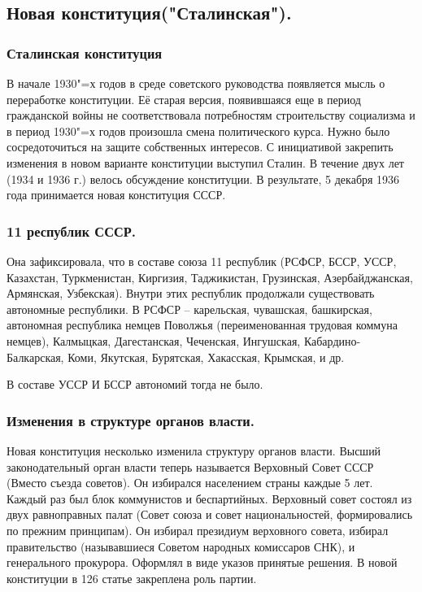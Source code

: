 \subsection{Новая конституция("Сталинская").}

\subsubsection{\textbf{Сталинская конституция}}
В начале 1930"=х годов в среде советского руководства появляется мысль о переработке конституции. Её старая версия, появившаяся еще в период гражданской войны не соответствовала потребностям строительству социализма и в период 1930"=х годов произошла смена политического курса. Нужно было сосредоточиться на защите собственных интересов. С инициативой закрепить изменения в новом варианте конституции выступил Сталин. В течение двух лет (1934 и 1936 г.) велось обсуждение конституции. В результате, 5 декабря 1936 года принимается новая конституция СССР. 

\subsubsection{\textbf{11 республик СССР.}}
Она зафиксировала, что в составе союза 11 республик (РСФСР, БССР, УССР, Казахстан, Туркменистан, Киргизия, Таджикистан, Грузинская, Азербайджанская, Армянская, Узбекская). Внутри этих республик продолжали существовать автономные республики. В РСФСР – карельская, чувашская, башкирская, автономная республика немцев Поволжья (переименованная трудовая коммуна немцев), Калмыцкая, Дагестанская, Чеченская, Ингушская, Кабардино-Балкарская, Коми, Якутская, Бурятская, Хакасская, Крымская, и др.

В составе УССР И БССР автономий тогда не было.

\subsubsection{\textbf{Изменения в структуре органов власти.}}

Новая конституция несколько изменила структуру органов власти. Высший законодательный орган власти теперь называется Верховный Совет СССР (Вместо съезда советов). Он избирался населением страны каждые 5 лет. Каждый раз был блок коммунистов и беспартийных. Верховный совет состоял из двух равноправных палат (Совет союза и совет национальностей, формировались по прежним принципам). Он избирал президиум верховного совета, избирал правительство (называвшиеся Советом народных комиссаров СНК), и генерального прокурора. Оформлял в виде указов принятые решения.
В новой конституции в 126 статье закреплена роль партии. 

